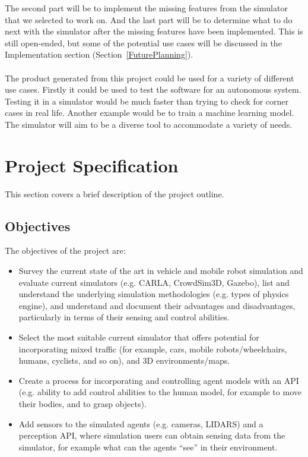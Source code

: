 The second part will be to implement the missing features from the simulator that we selected to work on.
And the last part will be to determine what to do next with the simulator after the missing features have been implemented. This is still open-ended, but some of the potential use cases will be discussed in the Implementation section (Section~\ref{FuturePlanning}).
\\~\\ 
The product generated from this project could be used for a variety of different use cases. Firstly it could be used to test the software for an autonomous system. Testing it in a simulator would be much faster than trying to check for corner cases in real life. Another example would be to train a machine learning model. The simulator will aim to be a diverse tool to accommodate a variety of needs. 

\section{Project Specification} \label{ProjectSpec}
This section covers a brief description of the project outline. 
\subsection{Objectives} \label{Objectives}
The objectives of the project are: 
\begin{itemize}
    \item Survey the current state of the art in vehicle and mobile robot simulation and evaluate current simulators (e.g. CARLA, CrowdSim3D, Gazebo), list and understand the underlying simulation methodologies (e.g. types of physics engine), and understand and document their advantages and disadvantages, particularly in terms of their sensing and control abilities.
    \item Select the most suitable current simulator that offers potential for incorporating mixed traffic (for example, cars, mobile robots/wheelchairs, humans, cyclists, and so on), and 3D environments/maps.
    \item Create a process for incorporating and controlling agent models with an API (e.g. ability to add control abilities to the human model, for example to move their bodies, and to grasp objects).
    \item Add sensors to the simulated agents (e.g. cameras, LIDARS) and a perception API, where simulation users can obtain sensing data from the simulator, for example what can the agents “see” in their environment.
\end{itemize}


